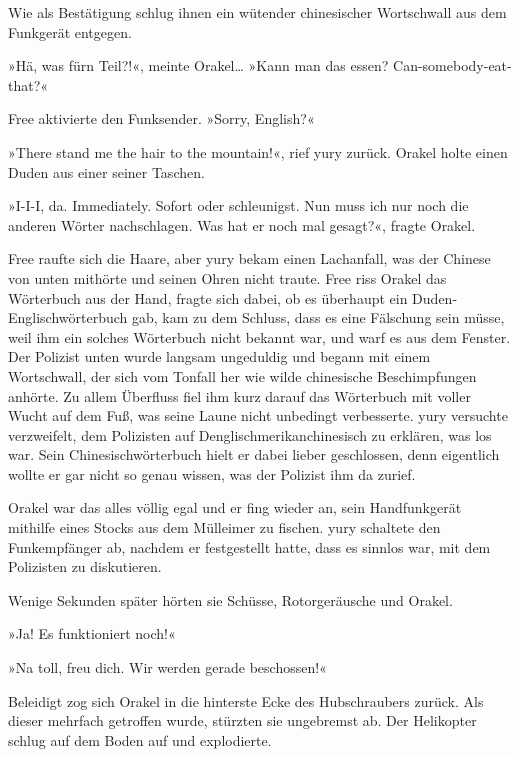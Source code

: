 Wie als Bestätigung schlug ihnen ein wütender chinesischer Wortschwall aus dem Funkgerät entgegen. 

»Hä, was fürn Teil?!«, meinte Orakel… »Kann man das essen? Can-somebody-eat-that?«


Free aktivierte den Funksender. »Sorry, English?«


»There stand me the hair to the mountain!«, rief yury zurück. Orakel holte einen Duden aus einer seiner Taschen.

»I-I-I, da. Immediately. Sofort oder schleunigst. Nun muss ich nur noch die anderen Wörter nachschlagen. Was hat er noch mal gesagt?«, fragte Orakel.

Free raufte sich die Haare, aber yury bekam einen Lachanfall, was der Chinese von unten mithörte und seinen Ohren nicht traute. Free riss Orakel das Wörterbuch aus der Hand, fragte sich dabei, ob es überhaupt ein Duden-Englischwörterbuch gab, kam zu dem Schluss, dass es eine Fälschung sein müsse, weil ihm ein solches Wörterbuch nicht bekannt war, und warf es aus dem Fenster. Der Polizist unten wurde langsam ungeduldig und begann mit einem Wortschwall, der sich vom Tonfall her wie wilde chinesische Beschimpfungen anhörte. Zu allem Überfluss fiel ihm kurz darauf das Wörterbuch mit voller Wucht auf dem Fuß, was seine Laune nicht unbedingt verbesserte. yury versuchte verzweifelt, dem Polizisten auf Denglischmerikanchinesisch zu erklären, was los war. Sein Chinesischwörterbuch hielt er dabei lieber geschlossen, denn eigentlich wollte er gar nicht so genau wissen, was der Polizist ihm da zurief.

Orakel war das alles völlig egal und er fing wieder an, sein Handfunkgerät mithilfe eines Stocks aus dem Mülleimer zu fischen. yury schaltete den Funkempfänger ab, nachdem er festgestellt hatte, dass es sinnlos war, mit dem Polizisten zu diskutieren.

Wenige Sekunden später hörten sie Schüsse, Rotorgeräusche und Orakel.

»Ja! Es funktioniert noch!«

»Na toll, freu dich. Wir werden gerade beschossen!«

Beleidigt zog sich Orakel in die hinterste Ecke des Hubschraubers zurück. Als dieser mehrfach getroffen wurde, stürzten sie ungebremst ab. Der Helikopter schlug auf dem Boden auf und explodierte.


